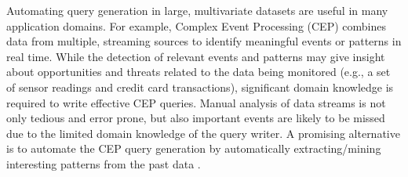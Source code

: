 \documentclass[conference]{IEEEtran}  %
\begin{document}
Automating query generation in large, multivariate datasets are useful in many application domains. For example, Complex Event Processing (CEP) \cite{IEEEexample:CEP} combines data from multiple, streaming sources to identify meaningful events or patterns in real time. While the detection of relevant events and patterns may give insight about opportunities and threats related to the data being monitored (e.g., a set of sensor readings and credit card transactions), significant domain knowledge is required to write effective CEP queries. Manual analysis of data streams is not only tedious and error prone, but also important events are likely to be missed due to the limited domain knowledge of the query writer. A promising alternative is to automate the CEP query generation by automatically extracting/mining interesting patterns from the past data \cite{IEEEexample:autoCEP,IEEEexample:TowardsAutomated,IEEEexample:LearningFromThePast}.
\end{document}
